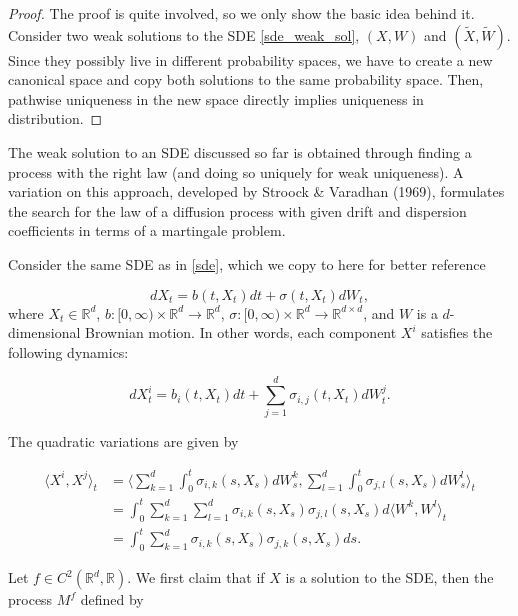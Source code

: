 \documentclass{article}
\begin{document}
\begin{proof}
The proof is quite involved, so we only show the basic idea behind it. Consider two weak solutions to the SDE \eqref{sde_weak_sol}, $(X,W)$ and $(\tilde{X},\tilde{W})$. Since they possibly live in different probability spaces, we have to create a new canonical space and copy both solutions to the same probability space. Then, pathwise uniqueness in the new space directly implies uniqueness in distribution. 
\end{proof}

The weak solution to an SDE discussed so far is obtained through finding a process with the right law (and doing so uniquely for weak uniqueness). A variation on this approach, developed by Stroock \& Varadhan (1969), formulates the search for the law of a diffusion process with given drift and dispersion coefficients in terms of a martingale problem. 

Consider the same SDE as in \eqref{sde}, which we copy to here for better reference

\begin{equation*}
dX_t = b(t,X_t)dt + \sigma(t,X_t)dW_t, 
\end{equation*}
where $X_t\in\mathbb{R}^d$, $b:[0,\infty)\times\mathbb{R}^d\rightarrow\mathbb{R}^d$, $\sigma:[0,\infty)\times\mathbb{R}^d\rightarrow\mathbb{R}^{d\times d}$, and $W$ is a $d$-dimensional Brownian motion. In other words, each component $X^i$ satisfies the following dynamics:

\begin{equation} \label{mart_prob_sde}
dX^i_t = b_i(t,X_t)dt + \sum^d_{j=1}\sigma_{i,j}(t,X_t)dW^j_t.
\end{equation}

The quadratic variations are given by 

\begin{equation*}
\begin{aligned}
\langle X^i, X^j\rangle_t &= \langle \sum^d_{k=1}\int^t_0\sigma_{i,k}(s,X_s)dW^k_s, \sum^d_{l=1}\int_0^t\sigma_{j,l}(s,X_s)dW^l_s\rangle_t\\
&=\int_0^t \sum^d_{k=1}\sum^d_{l=1}\sigma_{i,k}(s,X_s)\sigma_{j,l}(s,X_s)d\langle W^k,W^l\rangle_t\\
&=\int_0^t \sum^d_{k=1}\sigma_{i,k}(s,X_s)\sigma_{j,k}(s,X_s)ds.
\end{aligned}
\end{equation*}

Let $f\in C^2(\mathbb{R}^d,\mathbb{R})$. We first claim that if $X$ is a solution to the SDE, then the process $M^f$ defined by 
\end{document}
